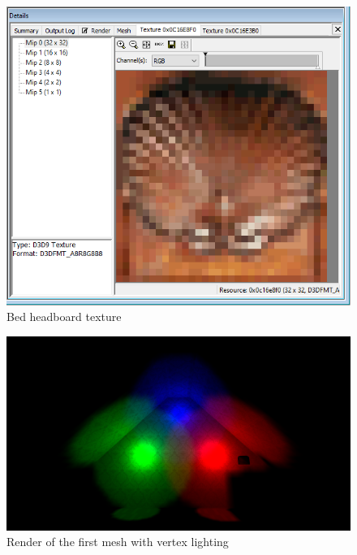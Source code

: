 \begin{appendix}
\begin{figure}[htbp]
	\centering
		\includegraphics[width=1.00\textwidth]{img/PIX/PIX_bedend_details.png}
	\caption[Bed headboard texture]{Bed headboard texture}
	\label{fig:BedHeadboardTexture}
\end{figure}

\clearpage

\begin{figure}[htbp]
	\centering
		\includegraphics[width=1.00\textwidth]{img/PIX/vertex_lit_mesh_render.png}
	\caption[Render of the first mesh with vertex lighting]{Render of the first mesh with vertex lighting}
	\label{fig:RenderForFirstVertexLitMesh}
\end{figure}




\end{appendix}
